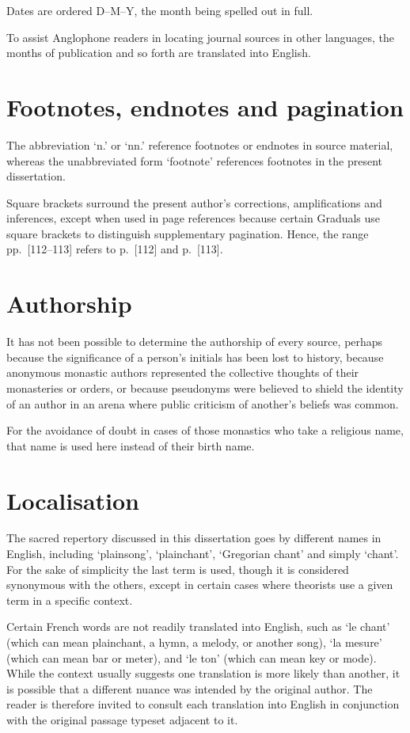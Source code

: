 Dates are ordered D--M--Y, the month being spelled out in full.

To assist Anglophone readers in locating journal sources in other languages, the months of publication and so forth are translated into English.

\section*{Footnotes, endnotes and pagination}
The abbreviation `n.' or `nn.' reference footnotes or endnotes in source material, whereas the unabbreviated form `footnote' references footnotes in the present dissertation.

Square brackets surround the present author's corrections, amplifications and inferences, except when used in page references because certain Graduals use square brackets to distinguish supplementary pagination. Hence, the range pp.~[112--113] refers to p.~[112] and p.~[113].

\section*{Authorship}
It has not been possible to determine the authorship of every source, perhaps because the significance of a person's initials has been lost to history, because anonymous monastic \mbox{authors} represented the collective thoughts of their monasteries or orders, or because pseudonyms were believed to shield the identity of an author in an arena where public criticism of another's beliefs was common.

For the avoidance of doubt in cases of those monastics who take a religious name, that name is used here instead of their birth name.

\pagebreak{}

\section*{Localisation}
The sacred repertory discussed in this dissertation goes by different names in English, including `plainsong', `plainchant', `Gregorian chant' and simply `chant'.
For the sake of simplicity the last term is used, though it is considered synonymous with the others, except in certain cases where theorists use a given term in a specific context.

Certain French words are not readily translated into English, such as `le chant' (which can mean plainchant, a hymn, a melody, or another song), `la mesure' (which can mean bar or meter), and `le ton' (which can mean key or mode).
While the context usually suggests one translation is more likely than another, it is possible that a different nuance was intended by the original author.
The reader is therefore invited to consult each translation into English in conjunction with the original passage typeset adjacent to it.

